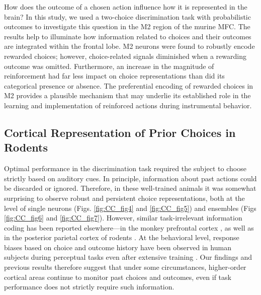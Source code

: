 
How does the outcome of a chosen action influence how it is represented in the brain? In this study, we used a two-choice discrimination task with probabilistic outcomes to investigate this question in the M2 region of the murine MFC. The results help to illuminate how information related to choices and their outcomes are integrated within the frontal lobe. M2 neurons were found to robustly encode rewarded choices; however, choice-related signals diminished when a rewarding outcome was omitted. Furthermore, an increase in the magnitude of reinforcement had far less impact on choice representations than did its categorical presence or absence. The preferential encoding of rewarded choices in M2 provides a plausible mechanism that may underlie its established role in the learning and implementation of reinforced actions during instrumental behavior.

\subsection*{Cortical Representation of Prior Choices in Rodents}
Optimal performance in the discrimination task required the subject to choose strictly based on auditory cues. In principle, information about past actions could be discarded or ignored. Therefore, in these well-trained animals it was somewhat surprising to observe robust and persistent choice representations, both at the level of single neurons (Figs. \ref{fig:CC_fig4} and \ref{fig:CC_fig5}) and ensembles (Figs \ref{fig:CC_fig6} and \ref{fig:CC_fig7}). However, similar task-irrelevant information coding has been reported elsewhere---in the monkey prefrontal cortex \citep{genovesio2014autonomous}, as well as in the posterior parietal cortex of rodents \citep{morcos2016history}. At the behavioral level, response biases based on choice and outcome history have been observed in human subjects during perceptual tasks even after extensive training \citep{frund2014quantifying, abrahamyan2016adaptable}. Our findings and previous results therefore suggest that under some circumstances, higher-order cortical areas continue to monitor past choices and outcomes, even if task performance does not strictly require such information.

